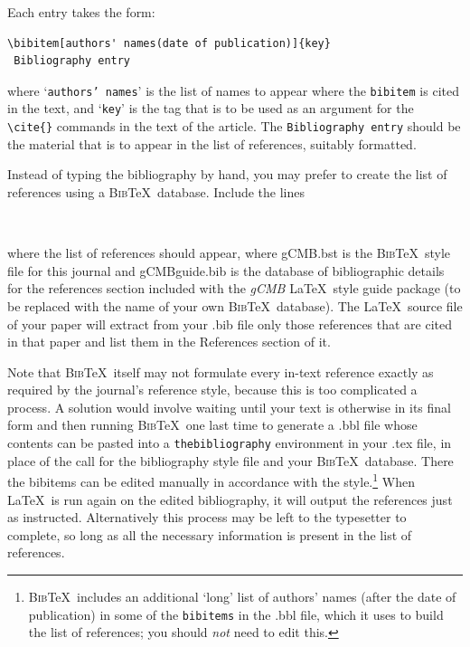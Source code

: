 \documentclass{gCMB2e}
\begin{document}
\bigskip
\noindent Each entry takes the form:
\begin{verbatim}
\bibitem[authors' names(date of publication)]{key}
 Bibliography entry
\end{verbatim}
\noindent where `\texttt{authors' names}' is the list of names to appear where the \verb"bibitem" is cited in the text, and `{\tt key}' is the tag that is to be used as an argument for the \verb"\cite{}" commands in the text of the article. The {\tt Bibliography entry} should be the material that is to appear in the list of references, suitably formatted.

Instead of typing the bibliography by hand, you may prefer to create the list of references using a \textsc{Bib}\TeX\ database. Include the lines
\begin{verbatim}


\end{verbatim}
where the list of references should appear, where gCMB.bst is the \textsc{Bib}\TeX\ style file for this journal and gCMBguide.bib is the database of bibliographic details for the references section included with the {\itshape gCMB} \LaTeX\ style guide package (to be replaced with the name of your own \textsc{Bib}\TeX\ database). The \LaTeX\ source file of your paper will extract from your .bib file only those references that are cited in that paper and list them in the References section of it.

Note that \textsc{Bib}\TeX\ itself may not formulate every in-text reference exactly as required by the journal's reference style, because this is too complicated a process. A solution would involve waiting until your text is otherwise in its final form and then running \textsc{Bib}\TeX\ one last time to generate a .bbl file whose contents can be pasted into a \texttt{thebibliography} environment in your .tex file, in place of the call for the bibliography style file and your \textsc{Bib}\TeX\ database. There the bibitems can be edited manually in accordance with the style.\footnote{\textsc{Bib}\TeX\ includes an additional `long' list of authors' names (after the date of publication) in some of the \texttt{bibitems} in the .bbl file, which it uses to build the list of references; you should \emph{not} need to edit this.} When \LaTeX\ is run again on the edited bibliography, it will output the references just as instructed. Alternatively this process may be left to the typesetter to complete, so long as all the necessary information is present in the list of references.
\end{document}

